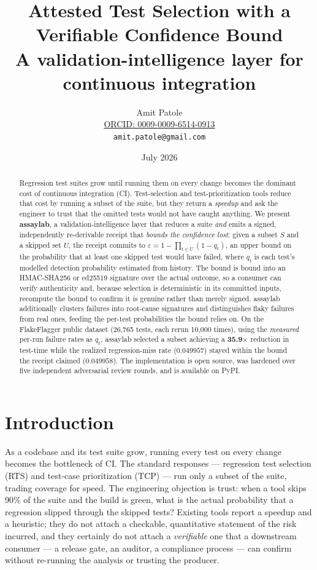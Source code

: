 \documentclass[11pt]{article}
\title{\vspace{-2em}\textbf{Attested Test Selection with a Verifiable Confidence Bound}\\
\large A validation-intelligence layer for continuous integration}
\author{Amit Patole\\
\small \href{https://orcid.org/0009-0009-6514-0913}{ORCID: 0009-0009-6514-0913}\\
\small \texttt{amit.patole@gmail.com}}
\date{July 2026}
\newcommand{\eps}{\varepsilon}
\begin{document}
\maketitle

\begin{abstract}
\noindent
Regression test suites grow until running them on every change becomes the
dominant cost of continuous integration (CI). Test-selection and
test-prioritization tools reduce that cost by running a subset of the suite, but
they return a \emph{speedup} and ask the engineer to trust that the omitted
tests would not have caught anything. We present \textbf{assaylab}, a
validation-intelligence layer that reduces a suite \emph{and} emits a signed,
independently re-derivable receipt that \emph{bounds the confidence lost}: given
a subset $S$ and a skipped set $U$, the receipt commits to
$\eps = 1 - \prod_{t \in U}(1 - q_t)$, an upper bound on the probability that at
least one skipped test would have failed, where $q_t$ is each test's modelled
detection probability estimated from history. The bound is bound into an
HMAC-SHA256 or ed25519 signature over the actual outcome, so a consumer can
verify authenticity and, because selection is deterministic in its committed
inputs, recompute the bound to confirm it is genuine rather than merely signed.
assaylab additionally clusters failures into root-cause signatures and
distinguishes flaky failures from real ones, feeding the per-test probabilities
the bound relies on. On the FlakeFlagger public dataset (26{,}765 tests, each
rerun 10{,}000 times), using the \emph{measured} per-run failure rates as $q_t$,
assaylab selected a subset achieving a \textbf{35.9$\times$} reduction in
test-time while the realized regression-miss rate ($0.049957$) stayed within the
bound the receipt claimed ($0.049958$). The implementation is open source, was
hardened over five independent adversarial review rounds, and is available on
PyPI.
\end{abstract}

\section{Introduction}

As a codebase and its test suite grow, running every test on every change
becomes the bottleneck of CI. The standard responses --- regression test
selection (RTS) and test-case prioritization (TCP) --- run only a subset of the
suite, trading coverage for speed. The engineering objection is trust: when a
tool skips 90\% of the suite and the build is green, what is the actual
probability that a regression slipped through the skipped tests? Existing tools
report a speedup and a heuristic; they do not attach a checkable, quantitative
statement of the risk incurred, and they certainly do not attach a
\emph{verifiable} one that a downstream consumer --- a release gate, an auditor,
a compliance process --- can confirm without re-running the analysis or trusting
the producer.
\end{document}
